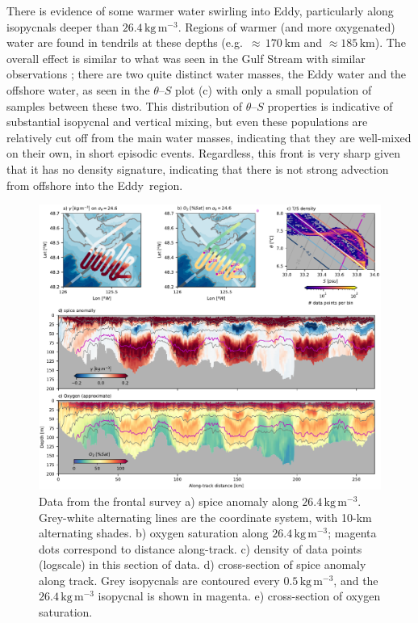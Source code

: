 \documentclass[draft]{agujournal2019}
\newcommand*{\Eddy}{{\sc Eddy}}
\begin{document}
There is evidence of some warmer water swirling into Eddy, particularly along isopycnals deeper than $26.4\,\mathrm{kg\,m^{-3}}$.  Regions of warmer (and more oxygenated) water are found in tendrils at these depths (e.g.\ $\approx\,170\ \mathrm{km}$ and $\approx 185\,\mathrm{km}$).  The overall effect is similar to what was seen in the Gulf Stream with similar observations \cite{klymaketal16}; there are two quite distinct water masses, the Eddy water and the offshore water, as seen in the $\theta$--$S$ plot (c) with only a small population of samples between these two.  This distribution of $\theta$--$S$ properties is indicative of substantial isopycnal and vertical mixing, but even these populations are relatively cut off from the main water masses, indicating that they are well-mixed on their own, in short episodic events.  Regardless, this front is very sharp given that it has no density signature, indicating that there is not strong advection from offshore into the \Eddy\ region.

\begin{figure}[htbp]
  \begin{center}
    \includegraphics[width=6.2in]{Frontsurvey}
    \caption{Data from the frontal survey  a) spice anomaly along $26.4\,\mathrm{kg\,m^{-3}}$.  Grey-white alternating lines are the coordinate system, with 10-km alternating shades.   b) oxygen saturation along $26.4\,\mathrm{kg\,m^{-3}}$; magenta dots correspond to distance along-track. c) density of data points (logscale) in this section of data.  d) cross-section of spice anomaly along track.  Grey isopycnals are contoured every $0.5\,\mathrm{kg\,m^{-3}}$, and the $26.4\,\mathrm{kg\,m^{-3}}$ isopycnal is shown in magenta.  e) cross-section of oxygen saturation.
      \label{fig:Frontsurvey} }
  \end{center}
\end{figure}
\end{document}
